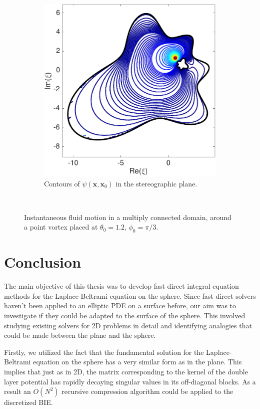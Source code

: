 \documentclass{sfuthesis}
\begin{document}
\begin{figure}[h]
\begin{subfigure}[b]{0.4\textwidth}
                \includegraphics[width=\textwidth]{Ex7-2TwoStarsStreamFnStereo}
                \caption{Contours of $\psi(\mathbf{x}, \mathbf{x}_0)$ in the stereographic plane.}
                \label{fig: Ex7-2TwoStarsStreamFnStereo}
 	 \end{subfigure}
        ~ 
        \caption{Instantaneous fluid motion in a multiply connected domain, around a point vortex placed at $\theta_0=1.2$, $\phi_0=\pi/3$.}
        \label{fig: Ex7-2TwoStarsInstantaneous}
  \end{figure}

\chapter{Conclusion}
The main objective of this thesis was to develop fast direct integral equation methods for the Laplace-Beltrami equation on the sphere. Since fast direct solvers haven't been applied to an elliptic PDE on a surface before, our aim was to investigate if they could be adapted to the surface of the sphere. This involved studying existing solvers for 2D problems in detail and identifying analogies that could be made between the plane and the sphere. 

Firstly, we utilized the fact that the fundamental solution  for the Laplace-Beltrami equation on the sphere has a very similar form as in the plane. This implies that just as in 2D, the matrix corresponding to the kernel of the double layer potential has rapidly decaying singular values in its off-diagonal blocks. As a result an $O(N^2)$ recursive compression algorithm could be applied to the discretized BIE. 
\end{document}
